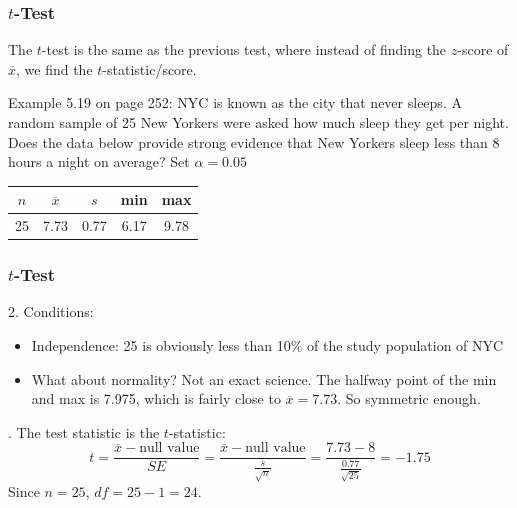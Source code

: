 \documentclass[slides]{beamer}
\newcommand{\blue}[1]{\textcolor{blue2}{#1}}
\newcommand{\xbar}{\overline{x}}
\begin{document}
\begin{frame}
\frametitle{$t$-Test}
The $t$-test is the same as the previous test, where instead of finding the $z$-score of $\xbar$, we find the \blue{$t$-statistic/score}.

\vspace{0.5cm}

\pause Example 5.19 on page 252:  NYC is known as the city that never sleeps.  A random sample of 25 New Yorkers were asked how much sleep they get per night. Does the data below provide strong evidence that New Yorkers sleep less than 8 hours a night on average?  Set $\alpha=0.05$

\vspace{0.5cm}
\begin{center}
\begin{tabular}{c|c|c|c|c}
$n$ & $\xbar$ & $s$ & min & max\\
\hline
25 & 7.73 & 0.77 & 6.17 & 9.78\\
\end{tabular}
\end{center}

\end{frame}











\begin{frame}
\frametitle{$t$-Test}
2. Conditions:
\begin{itemize}
\item \blue{Independence}: 25 is obviously less than 10\% of the study population of NYC
\item What about normality?  Not an exact science.  The halfway point of the min and max is 7.975, which is fairly close to $\xbar=7.73$.  So symmetric enough. 
\end{itemize}

\vspace{0.25cm}

. The test statistic is the $t$-statistic:
\[
t = \frac{\overline{x}-\mbox{null value}}{SE} = \frac{\overline{x}-\mbox{null value}}{\frac{s}{\sqrt n}} = \frac{7.73 - 8}{\frac{0.77}{\sqrt{25}}} = -1.75
\]
Since $n=25$, $df=25-1=24$.
\end{frame}
\end{document}
